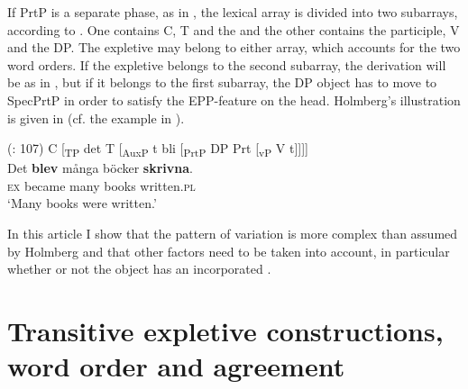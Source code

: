 \documentclass[output=paper]{LSP/langsci}
\begin{document}
\noindent If PrtP is a separate phase, as in , the lexical array is divided into two subarrays, according to \citet[106]{Holmberg2002Expletives}. One contains C, T and the  and the other contains the participle, V and the DP. The expletive may belong to either array, which accounts for the two word orders. If the expletive belongs to the second subarray, the derivation will be as in , but if it belongs to the first subarray, the DP object has to move to SpecPrtP in order to satisfy the EPP-feature on the head. Holmberg’s illustration is given in  (cf. the  example in ).


\ea%
    \label{ex:engdahl:6}
     (\citealt{Holmberg2002}: 107)
\ea \label{ex:engdahl:6a}
C [\textsubscript{TP} det T [\textsubscript{AuxP} t bli [\textsubscript{PrtP} DP Prt [\textsubscript{vP} V t]]]]\\
\ex \label{ex:engdahl:6b}
\gll Det  \textbf{blev} många  böcker    \textbf{skrivna}.\\
   \textsc{ex}    became  many  books    written\textsc{.pl}\\
\glt ‘Many books were written.'
\z
\z


\noindent In this article I show that the pattern of variation is more complex than assumed by Holmberg and that other factors need to be taken into account, in particular whether or not the object has an incorporated .

\section{Transitive expletive constructions, word order and agreement}%
\end{document}
